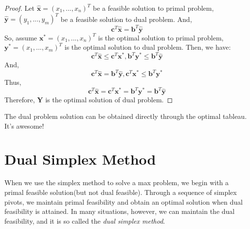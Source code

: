 \documentclass{article}
\begin{document}
\begin{proof}
	Let $\hat{\bm{x}} = (x_1, ..., x_n)^T$ be a feasible solution to primal problem, $\hat{\bm{y}} = (y_1, ..., y_m)^T$ be a feasible solution to dual problem. And,
	\begin{equation}
		\bm{c}^T \hat{\bm{x}}  = \bm{b}^T \hat{\bm{y}}
	\end{equation}
	So, assume $\bm{x}^* = (x_1, ..., x_n)^T$ is the optimal solution to primal problem, $\bm{y}^* = (x_1, ..., x_m)^T$ is the optimal solution to dual problem. Then, we have:
	\begin{equation}
		\bm{c}^T\hat{\bm{x}} \leq \bm{c}^T \bm{x}^*, \bm{b}^T \bm{y}^* \leq \bm{b}^T \hat{\bm{y}}
	\end{equation}
	And, 
	\begin{equation}
		\bm{c}^T\hat{\bm{x}} = \bm{b}^T\hat{\bm{y}}, \bm{c}^T\bm{x}^* \leq \bm{b}^T \bm{y}^*
	\end{equation}
	Thus,
	\begin{equation}
			\bm{c}^T\hat{\bm{x}} = \bm{c}^T \bm{x}^* = \bm{b}^T \bm{y}^* = \bm{b}^T \hat{\bm{y}}
	\end{equation}
	Therefore, $\bm{Y}$ is the optimal solution of dual problem.
\end{proof}

The dual problem solution can be obtained directly through the optimal tableau. It's awesome!


 \section{Dual Simplex Method}

When we use the simplex method to solve a max problem, we begin with a primal feasible solution(but not dual feasible). Through a sequence of simplex pivots, we maintain primal feasibility and obtain an optimal solution when dual feasibility is attained. In many situations, however, we can maintain the dual feasibility, and it is so called the \textit{dual simplex method}. 

% 
% 
\end{document}
